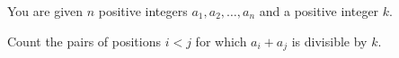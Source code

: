 You are given $n$ positive integers $a_1, a_2, \ldots, a_n$ and a positive integer $k$.

Count the pairs of positions $i < j$ for which $a_i + a_j$ is divisible by $k$.
